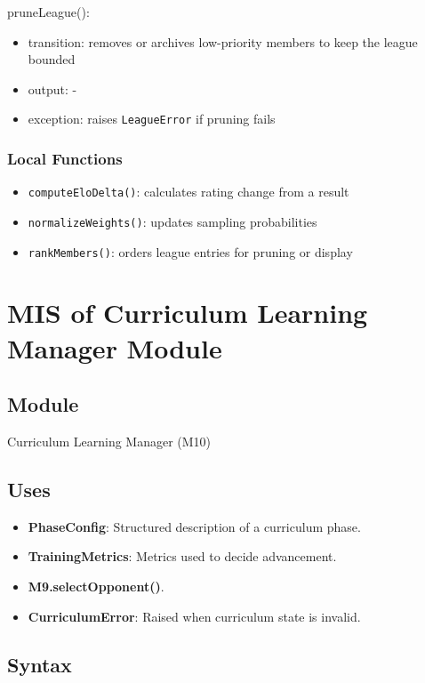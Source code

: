 \documentclass[12pt, titlepage]{article}
\begin{document}
\noindent pruneLeague():
\begin{itemize}
\item transition: removes or archives low-priority members to keep the league bounded
\item output: -
\item exception: raises \texttt{LeagueError} if pruning fails
\end{itemize}

\subsubsection{Local Functions}
\begin{itemize}
\item \texttt{computeEloDelta()}: calculates rating change from a result
\item \texttt{normalizeWeights()}: updates sampling probabilities
\item \texttt{rankMembers()}: orders league entries for pruning or display
\end{itemize}



\section{MIS of Curriculum Learning Manager Module} \label{M10}

\subsection{Module}
Curriculum Learning Manager (M10)

\subsection{Uses}
\begin{itemize}
    \item \textbf{PhaseConfig}: Structured description of a curriculum phase.
    \item \textbf{TrainingMetrics}: Metrics used to decide advancement.
    \item \textbf{M9.selectOpponent()}.
    \item \textbf{CurriculumError}: Raised when curriculum state is invalid.
\end{itemize}

\subsection{Syntax}
\end{document}
